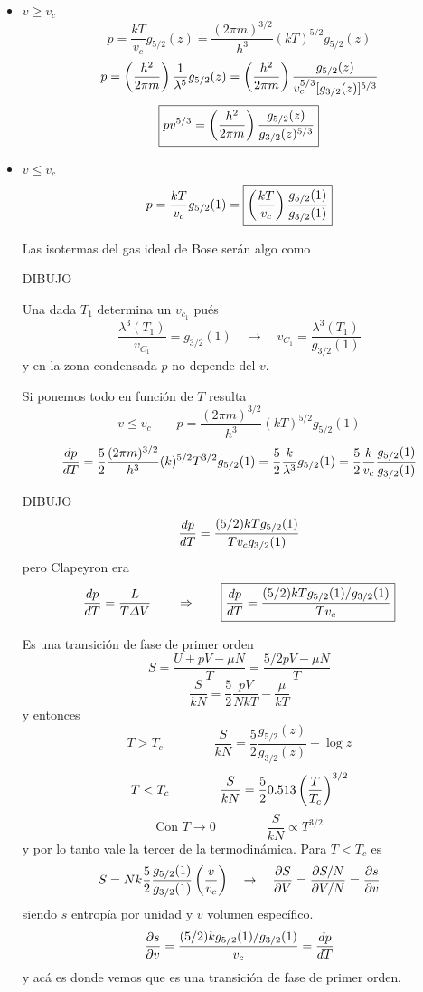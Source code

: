 \documentclass[10pt,oneside]{CBFT_book}
\begin{document}
\begin{itemize}
 \item $ v \geq v_c $
 \[
	p = \frac{ kT }{v_c} g_{5/2}(z) = \frac{ ( 2 \pi m )^{3/2} }{ h^3 } ( kT )^{5/2} g_{5/2}(z)
 \]
 \[
	p = \left( \frac{ h^2 }{ 2\pi m } \right)\frac{1}{\lambda^5}g_{5/2}(z) = 
	\left( \frac{ h^2 }{ 2\pi m } \right) \frac{g_{5/2}(z)}{v_c^{5/3} [g_{3/2}(z)]^{5/3}}
 \]
 \[
	\boxed{ p v^{5/3} = \left( \frac{ h^2 }{ 2\pi m } \right) \frac{g_{5/2}(z)}{ g_{3/2}(z)^{5/3}} }
 \]
 \item $ v \leq v_c$
 \[
	p = \frac{ kT }{v_c} g_{5/2}(1) = \boxed{ \left( \frac{ kT }{ v_c } \right) \frac{g_{5/2}(1)}{g_{3/2}(1)} }
 \]
 
 Las isotermas del gas ideal de Bose serán algo como 
 
 DIBUJO
 
 Una dada $ T_1 $ determina un $v_{c_1}$ pués
 \[
	\frac{\lambda^3(T_1)}{v_{C_1}} = g_{3/2}(1) \quad \to \quad v_{C_1} = \frac{\lambda^3(T_1)}{g_{3/2}(1)} 
 \]
 y en la zona condensada $p$ no depende del $v$.
 
 
 Si ponemos todo en función de $T$ resulta 
 \[
	v \leq v_c \qquad p = \frac{ ( 2 \pi m )^{3/2} }{ h^3 } ( kT )^{5/2} g_{5/2}(1)
 \]
 \[
	\frac{d^{\hspace{-0.05em}} {p}}{d {T}^{\hspace{-0.05em}}} =   \frac{5}{2} \frac{ ( 2 \pi m )^{3/2} }{ h^3 }  ( k )^{5/2} T^{3/2} g_{5/2}(1) =
	\frac{5}{2} \frac{k}{\lambda^3} g_{5/2}(1) = \frac{5}{2} \frac{k}{v_c} \frac{g_{5/2}(1)}{g_{3/2}(1)}
 \]
  
 DIBUJO 
 \[
	\frac{d^{\hspace{-0.05em}} { p }}{d { T }^{\hspace{-0.05em}}} = \frac{ ( 5/2 ) k T g_{5/2}(1) }{T v_c g_{3/2}(1) } 
 \]
 pero Clapeyron era
 \[
	\frac{d^{\hspace{-0.05em}} { p }}{d { T }^{\hspace{-0.05em}}} = \frac{ L }{ T \Delta V } \qquad \Rightarrow \qquad 
	\boxed{  \frac{d^{\hspace{-0.05em}} { p }}{d { T }^{\hspace{-0.05em}}} = \frac{ ( 5/2 ) k T g_{5/2}(1) / g_{3/2}(1) }{T v_c} }
 \]
 
Es una transición de fase de primer orden 
 \[
	S = \frac{U + pV - \mu N}{T} = \frac{ 5/2 pV - \mu N }{T}
 \]
 \[
	\frac{S}{kN} = \frac{5}{2} \frac{pV}{NkT} - \frac{\mu}{kT}
 \]
y entonces 
 \[
	T > T_c \qquad \qquad \frac{S}{kN} = \frac{5}{2} \frac{ g_{5/2}(z) }{ g_{3/2}(z) } - \log z
 \]
 \[
	T < T_c \qquad \qquad \frac{S}{kN} = \frac{5}{2} 0.513 \left( \frac{ T }{ T_c } \right)^{3/2}
 \]
 \[
	\text{Con } T \to 0 \qquad \qquad \frac{S}{kN} \propto T^{3/2} 
 \]
y por lo tanto vale la tercer de la termodinámica.
Para $ T < T_c $ es
\[
	S = N k \frac{5}{2} \frac{ g_{5/2}(1) }{ g_{3/2}(1) } \left( \frac{ v }{ v_c } \right) \quad \to \quad 
	\frac{\partial^{\hspace{-0.05em}} {S}}{\partial {V}^{\hspace{-0.05em}}} = \frac{\partial S/N}{\partial V/N} = \frac{\partial^{\hspace{-0.05em}} {s}}{\partial {v}^{\hspace{-0.05em}}}
\]
siendo $s$ entropía por unidad y $v$ volumen específico.
\[
	\frac{\partial^{\hspace{-0.05em}} {s}}{\partial {v}^{\hspace{-0.05em}}} =  \frac{ ( 5/2 ) k g_{5/2}(1) / g_{3/2}(1) }{v_c} = \frac{d^{\hspace{-0.05em}} {p}}{d {T}^{\hspace{-0.05em}}}
\]
y acá es donde vemos que es una transición de fase de primer orden.
\end{itemize}
\end{document}
